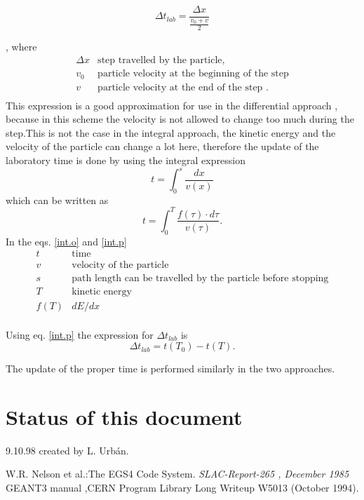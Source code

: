 \begin{equation}
\label{int.n}
  \Delta t_{lab} = \frac{\Delta x}{\frac{v_0 + v}{2}}
\end{equation}
 
  , where 
\[
\begin{array}{ll}
\Delta x    & \mbox{step travelled by the particle,} \\
 v_0  &
 \mbox{particle velocity at the beginning  of the step} \\
 v  &
 \mbox{particle velocity at the end of the step .} \\
\end{array}
\]
This expression is a good approximation for use in the differential
approach , because in this scheme the velocity is not allowed to
change too much during the step.This is not the case in the integral approach,
the kinetic energy and the velocity of the particle can change a lot here,
therefore the update of the laboratory time is done by using the integral
expression
\begin{equation}
\label{int.o}
 t = \int_{0}^{s} \frac{dx}{v(x)}
\end{equation}
which can be written as
\begin{equation}
\label{int.p}
 t = \int_{0}^{T} \frac{f(\tau ) \cdot d\tau }{v(\tau )}.
\end{equation}
In the eqs. \ref{int.o} and \ref{int.p} 
\[
\begin{array}{ll}
t  &  \mbox{time}  \\
v  &  \mbox{velocity of the particle} \\
s  &  \mbox{path length can be travelled by the particle before stopping} \\
T  &  \mbox{kinetic energy} \\
f(T) & dE/dx \\
\end{array}
\]

 Using eq. \ref{int.p} the expression for $\Delta t_{lab}$ is
\begin{equation}
\label{int.q}
 \Delta t_{lab} = t(T_0)-t(T)  .
\end{equation}

 The update of the proper time is performed similarly in the two approaches.

\section{Status of this document}
  9.10.98   created by L. Urb\'an.

\begin{thebibliography}{99}
 W.R. Nelson et al.:The EGS4 Code System.
   {\em SLAC-Report-265 , December 1985 }
  GEANT3 manual ,CERN Program Library Long Writeup W5013 (October 1994).
\end{thebibliography}

